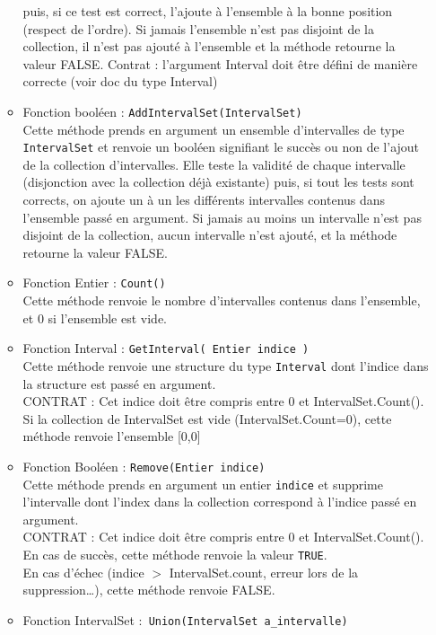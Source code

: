 \documentclass[a4paper,french,10pt,twoside]{article}
\begin{document}
\begin{itemize}
\begin{itemize}
			puis, si ce test est correct, l'ajoute à l'ensemble à la bonne position (respect de l'ordre).
			Si jamais l'ensemble n'est pas disjoint de la collection, il n'est pas ajouté à l'ensemble et 
			la méthode retourne la valeur FALSE.
			Contrat : l'argument Interval doit être défini de manière correcte (voir doc du type Interval)
		\item{Fonction booléen : \verb!AddIntervalSet(IntervalSet)!}\\
			Cette méthode prends en argument un ensemble d'intervalles de type \verb!IntervalSet! et renvoie un booléen
			signifiant le succès ou non de l'ajout de la collection d'intervalles.
			Elle teste la validité de chaque intervalle (disjonction avec la collection déjà existante)
			puis, si tout les tests sont corrects, on ajoute un à un les différents intervalles contenus dans l'ensemble
			passé en argument.
			Si jamais au moins un intervalle n'est pas disjoint de la collection, aucun intervalle n'est ajouté, et la 
			méthode retourne la valeur FALSE.
		\item{Fonction Entier : \verb!Count()!}\\
			Cette méthode renvoie le nombre d'intervalles contenus dans l'ensemble, et 0 si l'ensemble est vide.
		\item{Fonction Interval : \verb!GetInterval( Entier indice )!}\\
			Cette méthode renvoie une structure du type \verb!Interval! dont l'indice dans la structure est passé en
			argument.\\
			CONTRAT : Cet indice doit être compris entre $0$ et IntervalSet.Count().\\
			Si la collection de IntervalSet est vide (IntervalSet.Count=0), cette méthode renvoie l'ensemble [0,0]
		\item{Fonction Booléen : \verb!Remove(Entier indice)!}\\
			Cette méthode prends en argument un entier \verb!indice! et supprime l'intervalle dont l'index dans la collection correspond
			à l'indice passé en argument.\\
			CONTRAT : Cet indice doit être compris entre $0$ et IntervalSet.Count().\\
			En cas de succès, cette méthode renvoie la valeur \verb!TRUE!.\\
			En cas d'échec (indice $>$ IntervalSet.count, erreur lors de la suppression\dots), cette méthode renvoie FALSE. 
		\item{Fonction IntervalSet :\verb! Union(IntervalSet a_intervalle)!}\\

\end{itemize}
\end{itemize}
\end{document}
